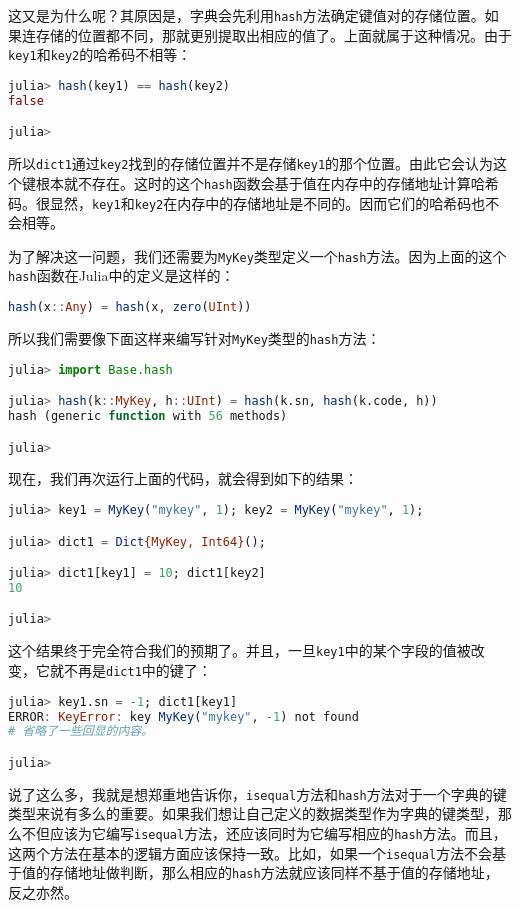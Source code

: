 这又是为什么呢？其原因是，字典会先利用\verb|hash|方法确定键值对的存储位置。如果连存储的位置都不同，那就更别提取出相应的值了。上面就属于这种情况。由于\verb|key1|和\verb|key2|的哈希码不相等：
\begin{lstlisting}[language=julia]
julia> hash(key1) == hash(key2)
false

julia> 
\end{lstlisting}

所以\verb|dict1|通过\verb|key2|找到的存储位置并不是存储\verb|key1|的那个位置。由此它会认为这个键根本就不存在。这时的这个\verb|hash|函数会基于值在内存中的存储地址计算哈希码。很显然，\verb|key1|和\verb|key2|在内存中的存储地址是不同的。因而它们的哈希码也不会相等。

为了解决这一问题，我们还需要为\verb|MyKey|类型定义一个\verb|hash|方法。因为上面的这个\verb|hash|函数在Julia中的定义是这样的：
\begin{lstlisting}[language=julia]
hash(x::Any) = hash(x, zero(UInt))
\end{lstlisting}

所以我们需要像下面这样来编写针对\verb|MyKey|类型的\verb|hash|方法：
\begin{lstlisting}[language=julia]
julia> import Base.hash

julia> hash(k::MyKey, h::UInt) = hash(k.sn, hash(k.code, h))
hash (generic function with 56 methods)

julia> 
\end{lstlisting}

现在，我们再次运行上面的代码，就会得到如下的结果：
\begin{lstlisting}[language=julia]
julia> key1 = MyKey("mykey", 1); key2 = MyKey("mykey", 1);

julia> dict1 = Dict{MyKey, Int64}(); 

julia> dict1[key1] = 10; dict1[key2]
10

julia> 
\end{lstlisting}

这个结果终于完全符合我们的预期了。并且，一旦\verb|key1|中的某个字段的值被改变，它就不再是\verb|dict1|中的键了：
\begin{lstlisting}[language=julia]
julia> key1.sn = -1; dict1[key1]
ERROR: KeyError: key MyKey("mykey", -1) not found
# 省略了一些回显的内容。

julia> 
\end{lstlisting}

说了这么多，我就是想郑重地告诉你，\verb|isequal|方法和\verb|hash|方法对于一个字典的键类型来说有多么的重要。如果我们想让自己定义的数据类型作为字典的键类型，那么不但应该为它编写\verb|isequal|方法，还应该同时为它编写相应的\verb|hash|方法。而且，这两个方法在基本的逻辑方面应该保持一致。比如，如果一个\verb|isequal|方法不会基于值的存储地址做判断，那么相应的\verb|hash|方法就应该同样不基于值的存储地址，反之亦然。

